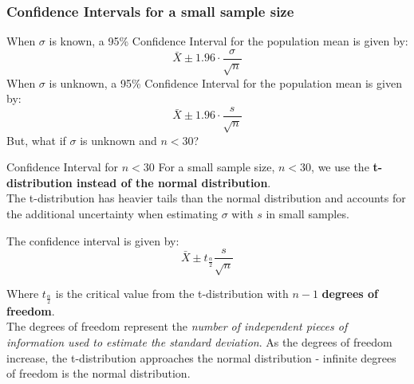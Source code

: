 \documentclass[a4paper, 10pt]{article}
\begin{document}
\subsubsection{Confidence Intervals for a small sample size}
When $\sigma$ is known, a 95\% Confidence Interval for the population mean is given by:
$$\bar{X} \pm 1.96  \cdot \frac{\sigma}{\sqrt{n}}$$
When $\sigma$ is unknown, a 95\% Confidence Interval for the population mean is given by:
$$\bar{X} \pm 1.96  \cdot \frac{s}{\sqrt{n}}$$
But, what if $\sigma$ is unknown and $n < 30$?
\begin{definitionbox}{Confidence Interval for $n < 30$}{}
    For a small sample size, $n < 30$, we use the \textbf{t-distribution instead of the normal distribution}. \\
    The t-distribution has heavier tails than the normal distribution and accounts for the additional uncertainty when estimating $\sigma$ with $s$ in small samples.

    The confidence interval is given by:
    $$\bar{X} \pm t_{\frac{\alpha}{2}} \frac{s}{\sqrt{n}}$$

    Where $t_{\frac{\alpha}{2}}$ is the critical value from the t-distribution with $n-1$ \textbf{degrees of freedom}. \\
    The degrees of freedom represent the \emph{number of independent pieces of information used to estimate the standard deviation}.
    As the degrees of freedom increase, the t-distribution approaches the normal distribution - infinite degrees of freedom is the normal distribution.

    \begin{center}
    \end{center}
\end{definitionbox}
\end{document}
